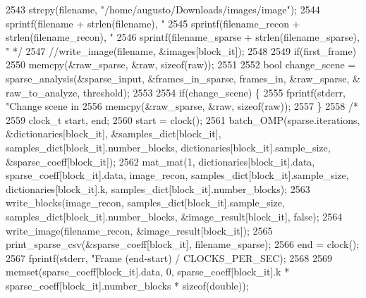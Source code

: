 \begin{DoxyCodeInclude}
{{{{{{{{{{{{{{{{{{{{{{{{{{{{{{{{{{{{{{{{{{{{{{{{{{{{{{{{{{{{{{{{{{{{{{2543 \textcolor{comment}{            strcpy(filename, "/home/augusto/Downloads/images/image");}
2544 \textcolor{comment}{            sprintf(filename + strlen(filename), "%
2545 \textcolor{comment}{            sprintf(filename\_recon + strlen(filename\_recon), "%
2546 \textcolor{comment}{            sprintf(filename\_sparse + strlen(filename\_sparse), "%
      */}
2547             \textcolor{comment}{//write\_image(filename, &images[block\_it]);}
2548 
2549             \textcolor{keywordflow}{if}(first\_frame)
2550               memcpy(&raw\_sparse, &raw, \textcolor{keyword}{sizeof}(raw));
2551 
2552             \textcolor{keywordtype}{bool} change\_scene = sparse\_analysis(&sparse\_input, &frames\_in\_sparse, frames\_in, &raw\_sparse, &
      raw\_to\_analyze, threshold);
2553 
2554             \textcolor{keywordflow}{if}(change\_scene) \{
2555               fprintf(stderr, \textcolor{stringliteral}{"Change scene in %
2556               memcpy(&raw\_sparse, &raw, \textcolor{keyword}{sizeof}(raw));
2557             \}
2558             \textcolor{comment}{/*}
2559 \textcolor{comment}{            clock\_t start, end;}
2560 \textcolor{comment}{            start = clock();}
2561 \textcolor{comment}{            batch\_OMP(sparse.iterations, &dictionaries[block\_it], &samples\_dict[block\_it],
       samples\_dict[block\_it].number\_blocks, dictionaries[block\_it].sample\_size, &sparse\_coeff[block\_it]);}
2562 \textcolor{comment}{            mat\_mat(1, dictionaries[block\_it].data, sparse\_coeff[block\_it].data, image\_recon,
       samples\_dict[block\_it].sample\_size, dictionaries[block\_it].k, samples\_dict[block\_it].number\_blocks);}
2563 \textcolor{comment}{            write\_blocks(image\_recon, samples\_dict[block\_it].sample\_size,
       samples\_dict[block\_it].number\_blocks, &image\_result[block\_it], false);}
2564 \textcolor{comment}{            write\_image(filename\_recon, &image\_result[block\_it]);}
2565 \textcolor{comment}{            print\_sparse\_csv(&sparse\_coeff[block\_it], filename\_sparse);}
2566 \textcolor{comment}{            end = clock();}
2567 \textcolor{comment}{            fprintf(stderr, "Frame %
       (end-start) / CLOCKS\_PER\_SEC);}
2568 \textcolor{comment}{}
2569 \textcolor{comment}{            memset(sparse\_coeff[block\_it].data, 0, sparse\_coeff[block\_it].k *
       sparse\_coeff[block\_it].number\_blocks * sizeof(double));}
}}}}}}}}}}}}}}}}}}}}}}}}}}}}}}}}}}}}}}}}}}}}}}}}}}}}}}}}}}}}}}}}}}}}}}}}}
\end{DoxyCodeInclude}
